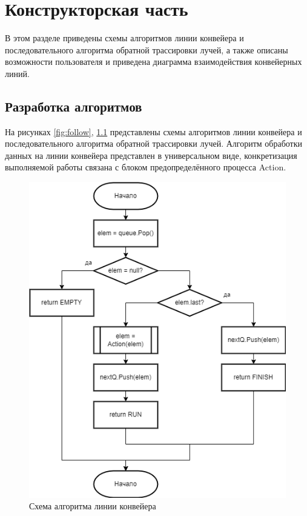 \chapter{Конструкторская часть}
В этом разделе приведены схемы алгоритмов линии конвейера и последовательного алгоритма обратной трассировки лучей, а также описаны возможности пользователя и приведена диаграмма взаимодействия конвейерных линий.

\section{Разработка алгоритмов}

На рисунках \ref{fig:follow}, \ref{fig:rtline} представлены схемы алгоритмов линии конвейера и последовательного алгоритма обратной трассировки лучей. Алгоритм обработки данных на линии конвейера представлен в универсальном виде, конкретизация выполняемой работы связана с блоком предопределённого процесса Action.

\begin{figure}[H]
	\centering
	\includegraphics{inc/img/rtline}
	\caption{Схема алгоритма линии конвейера}
	\label{fig:rtline}
\end{figure}

